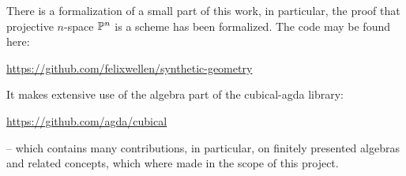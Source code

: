 There is a formalization of a small part of this work, in particular,
the proof that projective $n$-space $\mathbb{P}^n$ is a scheme has been formalized.
The code may be found here:
\begin{center}
  \url{https://github.com/felixwellen/synthetic-geometry}
\end{center}
It makes extensive use of the algebra part of the cubical-agda library:
\begin{center}
  \url{https://github.com/agda/cubical}
\end{center}
-- which contains many contributions, in particular,
on finitely presented algebras and related concepts,
which where made in the scope of this project.